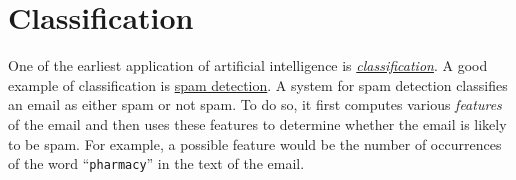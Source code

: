 \chapter{Classification}

One of the earliest application of artificial intelligence is 
\href{https://en.wikipedia.org/wiki/Statistical_classification}{\emph{classification}}.  A good
example of classification is \href{https://en.wikipedia.org/wiki/Anti-spam_techniques#Detecting_spam}{spam detection}.
A system for spam detection classifies an email as either spam or not spam.  To do so, it first
computes various \emph{features} of the email and then uses these features to determine whether the email is
likely to be spam.  For example, a possible feature would be the number of occurrences of the word
``\texttt{pharmacy}'' in the text of the email.

